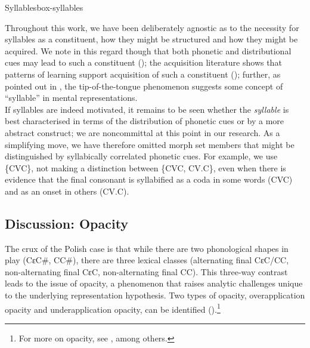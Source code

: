 \begin{dadpbox}{Syllables}{box-syllables}

Throughout this work, we have been deliberately agnostic as to the necessity for syllables as a constituent, how they might be structured and how they might be acquired. We note in this regard though that both phonetic and distributional cues may lead to such a constituent (\citealt{Maddieson:1985, Turk:1994}); the acquisition literature shows that  patterns of learning support acquisition of such a constituent (\citealt{Carter:1999, Carter+:2004}); further, as pointed out in \citet{vandeWeijer:2012}, the tip-of-the-tongue phenomenon suggests some concept of ``syllable'' in mental representations. \\

If syllables are indeed motivated, it remains to be seen whether the \textit{syllable} is best characterised in terms of the distribution of phonetic cues or by a more abstract construct; we are noncommittal at this point in our research.  As a simplifying move, we have therefore omitted morph set members that might be distinguished by syllabically correlated phonetic cues. For example, we use \{CVC\}, not making a distinction between \{CVC, CV.C\}, even when there is evidence that the final consonant is syllabified as a coda in some words (CVC) and as an onset in others (CV.C).

\end{dadpbox}

\subsection{Discussion: Opacity}\label{section_opacity-in-Polish}

\largerpage[-1]
The crux of the Polish case is that while there are two phonological shapes in play (CɛC\#, CC\#), there are three lexical classes (alternating final CɛC/CC, non-alternating final CɛC, non-alternating final CC). This three-way contrast leads  to the issue of opacity,  a phenomenon that raises analytic challenges unique to the underlying representation hypothesis.  Two types of opacity, overapplication opacity and underapplication opacity, can be identified (\citealt{Kager:1999,McCarthy:1999, Idsardi:2000}).\footnote{For more on opacity, see \citet{Kiparsky:1971, Kiparsky:1973abstractness, Kiparsky:1979, Kiparsky:2000, McCarthy:1996, Bakovic:2011-Wiley}, among others.}


